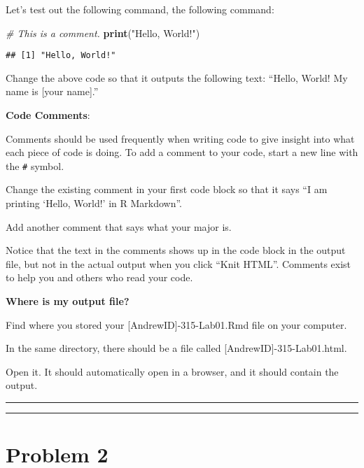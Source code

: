 \documentclass[]{article}
\newenvironment{Shaded}{\begin{snugshade}}{\end{snugshade}}
\newcommand{\CommentTok}[1]{\textcolor[rgb]{0.56,0.35,0.01}{\textit{#1}}}
\newcommand{\KeywordTok}[1]{\textcolor[rgb]{0.13,0.29,0.53}{\textbf{#1}}}
\newcommand{\NormalTok}[1]{#1}
\newcommand{\StringTok}[1]{\textcolor[rgb]{0.31,0.60,0.02}{#1}}
\begin{document}
Let's test out the following command, the following command:

\begin{Shaded}
\begin{Highlighting}[]
\CommentTok{# This is a comment.}
\KeywordTok{print}\NormalTok{(}\StringTok{"Hello, World!"}\NormalTok{)}
\end{Highlighting}
\end{Shaded}

\begin{verbatim}
## [1] "Hello, World!"
\end{verbatim}

Change the above code so that it outputs the following text: ``Hello,
World! My name is {[}your name{]}.''

\textbf{Code Comments}:

Comments should be used frequently when writing code to give insight
into what each piece of code is doing. To add a comment to your code,
start a new line with the \texttt{\#} symbol.

Change the existing comment in your first code block so that it says ``I
am printing `Hello, World!' in R Markdown''.

Add another comment that says what your major is.

Notice that the text in the comments shows up in the code block in the
output file, but not in the actual output when you click ``Knit HTML''.
Comments exist to help you and others who read your code.

\textbf{Where is my output file?}

Find where you stored your {[}AndrewID{]}-315-Lab01.Rmd file on your
computer.

In the same directory, there should be a file called
{[}AndrewID{]}-315-Lab01.html.

Open it. It should automatically open in a browser, and it should
contain the output.

\begin{center}\rule{0.5\linewidth}{\linethickness}\end{center}

\begin{center}\rule{0.5\linewidth}{\linethickness}\end{center}

\hypertarget{problem-2}{%
\section{Problem 2}\label{problem-2}}
\end{document}
